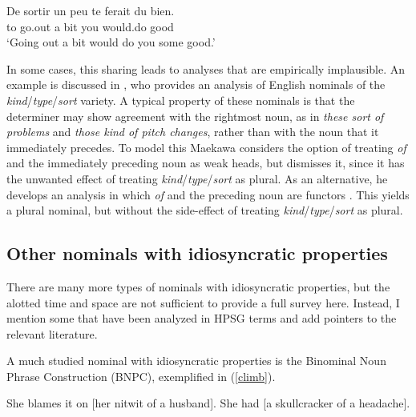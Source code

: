 \documentclass[output=paper
	        ,collection
	        ,collectionchapter
 	        ,biblatex
                ,babelshorthands
                ,newtxmath
                ,draftmode
                ,colorlinks, citecolor=brown
]{langscibook}
\begin{document}
\begin{exe} 
\ex\label{sorti}   
\gll   De sortir un peu te ferait du bien.  \\
       to go.out a bit you would.do {} good \\
\trans `Going out a bit would do you some good.'
\end{exe}  

\noindent
In some cases, this sharing leads to analyses that are empirically implausible. 
An example is discussed in \citet{Maekawa15}, who provides  
an analysis of English nominals of the \emph{kind}/\emph{type}/\emph{sort} variety.  
A typical property of these nominals is that the determiner may show agreement with the 
rightmost noun, as in \emph{these sort of problems} and \emph{those kind of pitch changes},
rather than with the noun that it immediately precedes. 
To model this Maekawa considers the option of treating \emph{of} and the immediately 
preceding noun as weak heads, but dismisses it, since it has the unwanted effect of treating 
\emph{kind}/\emph{type}/\emph{sort} as plural. 
As an alternative, he develops an analysis in which \emph{of} and 
the preceding noun are functors \citep[149]{Maekawa15}. This yields a plural nominal, but 
without the side-effect of treating \emph{kind}/\emph{type}/\emph{sort} as plural. 


\subsection{Other nominals with idiosyncratic properties} 
\label{other}


There are many more types of nominals with idiosyncratic properties,
but the alotted time and space are not sufficient to provide a full survey here. 
Instead, I mention some that have been analyzed in HPSG terms and add pointers 
to the relevant literature.    

A much studied nominal with idiosyncratic properties is the Binominal Noun Phrase 
Construction (BNPC), exemplified in (\ref{climb}). 

\begin{exe}
\ex\label{climb}
\begin{xlist}
\ex  She blames it on [her nitwit of a husband]. 
\ex  She had [a skullcracker of a headache]. 
\end{xlist}
\end{exe}
\end{document}
